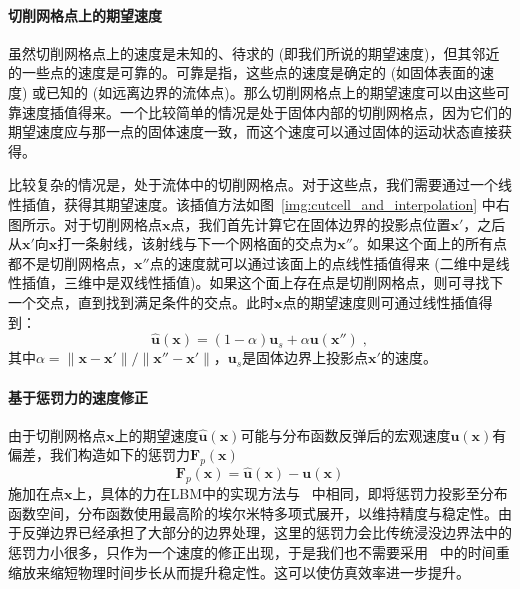 \paragraph{切削网格点上的期望速度}
虽然切削网格点上的速度是未知的、待求的 (即我们所说的期望速度)，但其邻近的一些点的速度是可靠的。可靠是指，这些点的速度是确定的 (如固体表面的速度) 或已知的 (如远离边界的流体点)。那么切削网格点上的期望速度可以由这些可靠速度插值得来。一个比较简单的情况是处于固体内部的切削网格点，因为它们的期望速度应与那一点的固体速度一致，而这个速度可以通过固体的运动状态直接获得。

比较复杂的情况是，处于流体中的切削网格点。对于这些点，我们需要通过一个线性插值，获得其期望速度。该插值方法如图~\ref{img:cutcell_and_interpolation} 中右图所示。对于切削网格点$\bm{x}$点，我们首先计算它在固体边界的投影点位置$\bm{x}'$，之后从$\bm{x}'$向$\bm{x}$打一条射线，该射线与下一个网格面的交点为$\bm{x}''$。如果这个面上的所有点都不是切削网格点，$\bm{x}''$点的速度就可以通过该面上的点线性插值得来 (二维中是线性插值，三维中是双线性插值)。如果这个面上存在点是切削网格点，则可寻找下一个交点，直到找到满足条件的交点。此时$\bm{x}$点的期望速度则可通过线性插值得到：
\begin{equation}  \label{eq:vel_lerp}
\hat{\bm{u}}(\bm{x})=(1-\alpha)\bm{u}_s + \alpha \bm{u}(\bm{x}'')\;,
\end{equation}
其中$\alpha=\|\bm{x}-\bm{x}'\|/\|\bm{x}''-\bm{x}'\|$，$\bm{u}_s$是固体边界上投影点$\bm{x}'$的速度。

\paragraph{基于惩罚力的速度修正}
由于切削网格点$\bm{x}$上的期望速度$\hat{\bm{u}}(\bm{x})$可能与分布函数反弹后的宏观速度$\bm{u}(\bm{x})$有偏差，我们构造如下的惩罚力$\bm{F}_p(\bm{x})$
\begin{equation} \label{eq:penaltyForce}
\bm{F}_p(\bm{x}) = \hat{\bm{u}}(\bm{x})-\bm{u}(\bm{x})
\end{equation}
施加在点$\bm{x}$上，具体的力在LBM中的实现方法与~\cite{Li-2020} 中相同，即将惩罚力投影至分布函数空间，分布函数使用最高阶的埃尔米特多项式展开，以维持精度与稳定性。由于反弹边界已经承担了大部分的边界处理，这里的惩罚力会比传统浸没边界法中的惩罚力小很多，只作为一个速度的修正出现，于是我们也不需要采用~\cite{Li-2020} 中的时间重缩放来缩短物理时间步长从而提升稳定性。这可以使仿真效率进一步提升。

